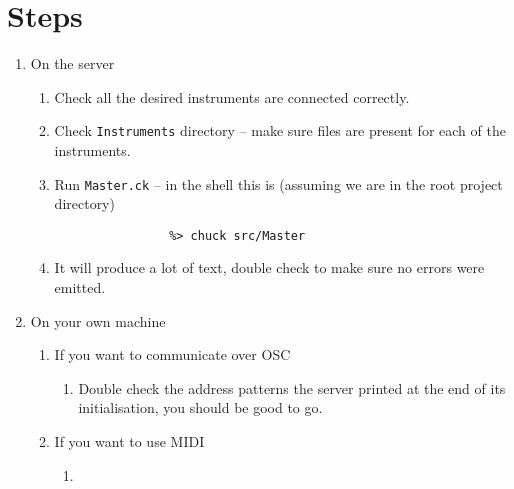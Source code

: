 \documentclass{article}
\begin{document}
\section{Steps}

\begin{enumerate} [\bf 1.]
\item {\large On the server}
	\begin{enumerate} [\bf i.]

		\item{Check all the desired instruments are connected correctly.}
		\item{Check \texttt{Instruments} directory -- make sure files are present for each of the instruments.}
		\item Run \texttt{Master.ck} -- in the shell this is (assuming we are in the root project directory)
		\begin{verbatim}
			    %> chuck src/Master
		\end{verbatim}
		\item  It will produce a lot of text, double check to make sure no errors were emitted.
	\end{enumerate}
\item {\large On your own machine}
	\begin{enumerate} [\bf i.]
		\item {If you want to communicate over OSC}
		\begin{enumerate} [\bf a.]
			\item{Double check the address patterns the server printed at the end of its initialisation, you should be good to go.}
		\end{enumerate}
		\item {If you want to use MIDI}
		\begin{enumerate} [\bf a.]
			\item{}
		\end{enumerate}
	\end{enumerate}

\end{enumerate}
\end{document}
